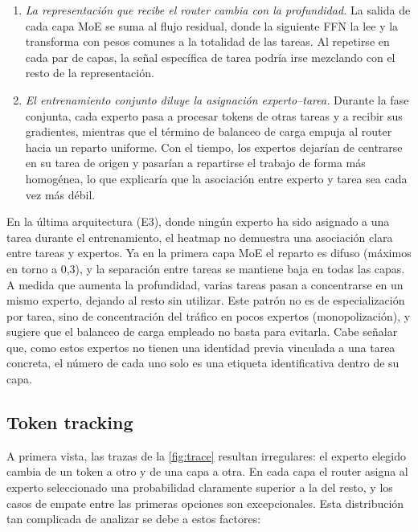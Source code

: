 \documentclass[10pt,twocolumn,a4paper]{article}
\begin{document}
\begin{enumerate}[label=\textbf{H\arabic*.}, ref=H\arabic*, leftmargin=*, nosep]
  \item \label{hyp:residual}
    \emph{La representación que recibe el router cambia con la profundidad.}
    La salida de cada capa MoE se suma al flujo residual, donde la siguiente FFN  la lee y la transforma con pesos comunes a la totalidad de las tareas. Al repetirse en cada par de capas, la señal específica de tarea podría irse mezclando con el resto de la representación.
  \item \label{hyp:balance}
    \emph{El entrenamiento conjunto diluye la asignación experto--tarea.} Durante la fase conjunta, cada experto pasa a procesar tokens de otras tareas y a recibir sus gradientes, mientras que el término de balanceo de carga empuja al router hacia un reparto uniforme. Con el tiempo, los expertos dejarían de centrarse en su tarea de origen y pasarían a repartirse el trabajo de forma más homogénea, lo que explicaría que la asociación entre experto y tarea sea cada vez más débil.
\end{enumerate}

En la última arquitectura (E3), donde ningún experto ha sido asignado a una tarea durante el entrenamiento, el heatmap no demuestra una asociación clara entre tareas y expertos. Ya en la primera capa MoE el reparto es difuso (máximos en torno a 0,3), y la separación entre tareas se mantiene baja en todas las capas. A medida que aumenta la profundidad, varias tareas pasan a concentrarse en un mismo experto, dejando al resto sin utilizar. Este patrón no es de especialización por tarea, sino de concentración del tráfico en pocos expertos (monopolización), y sugiere que el balanceo de carga empleado no basta para evitarla. Cabe señalar que, como estos expertos no tienen una identidad previa vinculada a una tarea concreta, el número de cada uno solo es una etiqueta identificativa dentro de su capa.


\subsection{Token tracking}
\label{sec:e2}
A primera vista, las trazas de la \cref{fig:trace} resultan irregulares: el experto elegido cambia de un token a otro y de una capa a otra. En cada capa el router asigna al experto seleccionado una probabilidad claramente superior a la del resto, y los casos de empate entre las primeras opciones son excepcionales. Esta distribución tan complicada de analizar se debe a estos factores:
\end{document}
